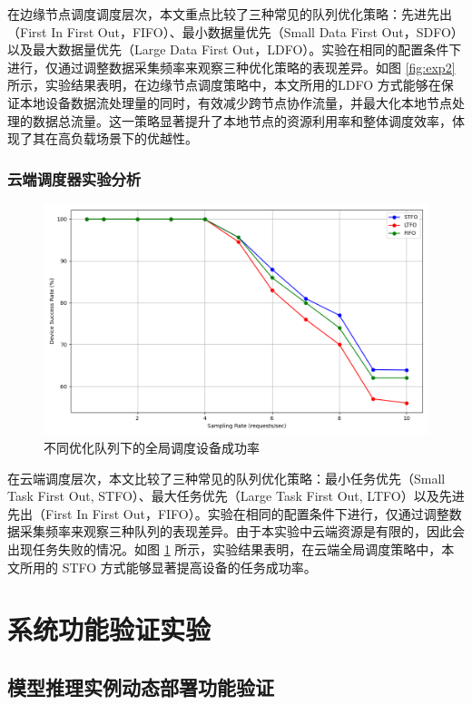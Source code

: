 在边缘节点调度调度层次，本文重点比较了三种常见的队列优化策略：先进先出（First In First Out，FIFO）、最小数据量优先（Small Data First Out，SDFO）以及最大数据量优先（Large Data First Out，LDFO）。实验在相同的配置条件下进行，仅通过调整数据采集频率来观察三种优化策略的表现差异。如图 \ref{fig:exp2} 所示，实验结果表明，在边缘节点调度策略中，本文所用的LDFO 方式能够在保证本地设备数据流处理量的同时，有效减少跨节点协作流量，并最大化本地节点处理的数据总流量。这一策略显著提升了本地节点的资源利用率和整体调度效率，体现了其在高负载场景下的优越性。

\subsubsection{云端调度器实验分析}

\begin{figure}[ht]
  \centering
  \includegraphics[width=0.8\linewidth]{pics/expr/exp5_frequency_device_success_rate.png}
  \caption{不同优化队列下的全局调度设备成功率}
  \label{fig:exp4}
\end{figure}

在云端调度层次，本文比较了三种常见的队列优化策略：最小任务优先（Small Task First Out, STFO）、最大任务优先（Large Task First Out, LTFO）以及先进先出（First In First Out，FIFO）。实验在相同的配置条件下进行，仅通过调整数据采集频率来观察三种队列的表现差异。由于本实验中云端资源是有限的，因此会出现任务失败的情况。如图 \ref{fig:exp4} 所示，实验结果表明，在云端全局调度策略中，本文所用的 STFO 方式能够显著提高设备的任务成功率。

\section{系统功能验证实验}

\subsection{模型推理实例动态部署功能验证}

